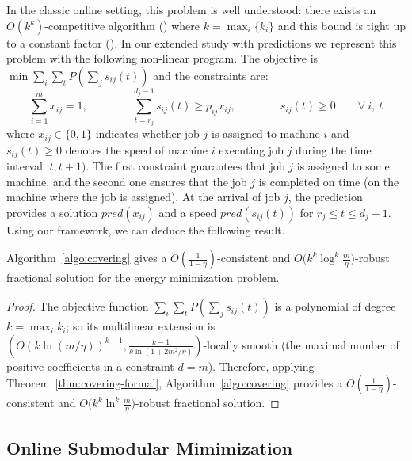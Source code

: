 In the classic online setting, this problem is well understood: there exists an $O(k^{k})$-competitive algorithm (\cite{Thang20:Online-Primal-Dual}) where $k = \max_{i} \{k_{i}\}$
and this bound is tight up to a constant factor (\cite{Caragiannis08:Better-bounds}). In our extended study with predictions we represent this problem with the following non-linear program. The objective is $\min \sum_{i} \sum_{t} P(\sum_{j} s_{ij}(t))$ and the constraints are:
$$
\sum_{i=1}^{m} x_{ij} = 1,  \qquad \qquad \sum_{t = r_{j}}^{d_{j}-1} s_{ij}(t) \geq p_{ij} x_{ij}, \qquad  \qquad s_{ij}(t) \geq 0  \qquad \forall\ i,\ t
$$
where $x_{ij} \in \{0,1\}$ indicates whether job $j$ is assigned to machine $i$
and $s_{ij}(t) \geq 0$ denotes the speed of machine $i$ executing job $j$ during the time interval $[t, t+1)$.
The first constraint guarantees that job $j$ is assigned to some machine, and the second one ensures
that the job $j$ is completed on time (on the machine where the job is assigned). At the arrival of
job $j$, the prediction provides a solution $pred(x_{ij})$ and a speed $pred(s_{ij}(t))$ for $r_{j} \leq t \leq d_{j} - 1$.
Using our framework, we can deduce the following result.

\begin{proposition}
Algorithm~\ref{algo:covering} gives a
$O(\frac{1}{1 - \eta})$-consistent and $O\bigl(k^{k} \log^{k} \frac{m}{\eta}\bigr)$-robust fractional solution
for the energy minimization problem.
\end{proposition}
%
\begin{proof}
The objective function $\sum_{i} \sum_{t} P(\sum_{j} s_{ij}(t))$ is a polynomial of degree $k = \max_{i} k_{i}$;
so its multilinear extension is
$(O(k \ln(m/\eta))^{k-1}, \frac{k-1}{k \ln(1 + 2m^{2}/\eta)})$-locally smooth
(the maximal number of positive coefficients in a constraint $d = m$).
Therefore, applying Theorem~\ref{thm:covering-formal},
Algorithm~\ref{algo:covering} provides a $O(\frac{1}{1 - \eta})$-consistent and $O\bigl(k^{k} \ln^{k} \frac{m}{\eta}\bigr)$-robust
fractional solution.
\end{proof}




\subsection{Online Submodular Mimimization}	\label{apix:sub-min}


